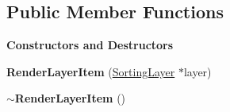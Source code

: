 \subsection*{Public Member Functions}
\begin{Indent}\textbf{ Constructors and Destructors}\par
\begin{DoxyCompactItemize}
\item 
\mbox{\label{classrev_1_1_view_1_1_render_layer_item_ad06b0ebe1d2b52953fd96b981f8741a1}} 
{\bfseries Render\+Layer\+Item} (\mbox{\hyperlink{structrev_1_1_sorting_layer}{Sorting\+Layer}} $\ast$layer)
\item 
\mbox{\label{classrev_1_1_view_1_1_render_layer_item_ae496d5991c3cdb69e2f25b64d5d08d3a}} 
{\bfseries $\sim$\+Render\+Layer\+Item} ()
\end{DoxyCompactItemize}
\end{Indent}
